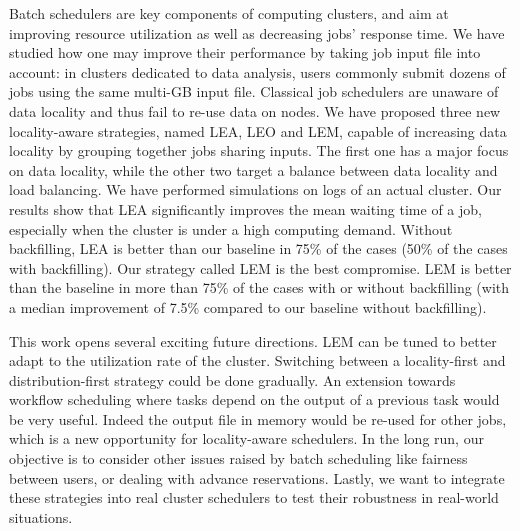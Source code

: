 \documentclass[conference]{IEEEtran}
\begin{document}
Batch schedulers are key components of computing clusters, and aim at
improving resource utilization as well as decreasing jobs' response
time. We have studied how one may improve their performance by taking
job input file into account: in clusters dedicated to data analysis,
users commonly submit dozens of jobs using the same multi-GB input
file. Classical job schedulers are unaware of data locality and thus
fail to re-use data on nodes. We have proposed three new locality-aware
strategies, named LEA, LEO and LEM,
capable of increasing data locality by grouping together 
jobs sharing inputs. The first one has a major focus on data locality,
while the other two target a balance between data locality and load
balancing. We have performed simulations on logs of an actual
cluster. Our results show that LEA significantly improves the mean
waiting time of a job, especially  
when the cluster is under a high computing demand.
Without backfilling, LEA is better than our baseline in 75\% of the
cases (50\% of the cases with backfilling).
Our strategy called LEM is the best compromise. LEM is better than the baseline in more than 75\% of the cases with or without backfilling
(with a median improvement of 7.5\% compared to our baseline without backfilling).

This work opens several exciting future directions.
LEM can be tuned to better adapt to the utilization rate of the cluster.
Switching between a locality-first and distribution-first strategy could be done 
gradually.
An extension towards workflow scheduling where tasks depend on the output of a previous task would be very useful.
Indeed the output file in memory would be re-used for other jobs, which is a 
new opportunity for locality-aware schedulers.
In the long run, our objective is to consider other issues raised by batch scheduling like
fairness between users, or dealing with advance reservations.
Lastly, we want to integrate these strategies into real cluster schedulers
to test their robustness in real-world situations.



\end{document}
